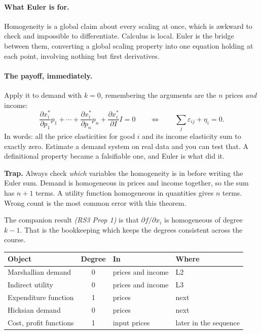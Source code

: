 \documentclass[11pt]{article}
\theoremstyle{definition}
\newenvironment{keybox}{\begin{snugshade}\noindent\ignorespaces}{\end{snugshade}}
\newcommand{\pdd}[2]{\frac{\partial #1}{\partial #2}}
\newcommand{\src}[1]{\textit{\small (#1)}}
\begin{document}
\paragraph{What Euler is for.} Homogeneity is a global claim about every scaling at once,
which is awkward to check and impossible to differentiate. Calculus is local. Euler is the
bridge between them, converting a global scaling property into one equation holding at each
point, involving nothing but first derivatives.

\paragraph{The payoff, immediately.} Apply it to demand with $k=0$, remembering the
arguments are the $n$ prices \emph{and} income:
\[
\pdd{x_i^*}{p_1}p_1+\cdots+\pdd{x_i^*}{p_n}p_n+\pdd{x_i^*}{I}I=0
\qquad\Longleftrightarrow\qquad
\sum_j \varepsilon_{ij}+\eta_i=0.
\]
In words: all the price elasticities for good $i$ and its income elasticity sum to exactly
zero. Estimate a demand system on real data and you can test that. A definitional property
became a falsifiable one, and Euler is what did it.

\begin{keybox}
\textbf{Trap.} Always check \emph{which} variables the homogeneity is in before writing the
Euler sum. Demand is homogeneous in prices and income together, so the sum has $n+1$ terms.
A utility function homogeneous in quantities gives $n$ terms. Wrong count is the most common
error with this theorem.
\end{keybox}

\vspace{3pt}
\noindent The companion result \src{RS3 Prop 1} is that $\partial f/\partial x_i$ is
homogeneous of degree $k-1$. That is the bookkeeping which keeps the degrees consistent
across the course.

\begin{center}
\begin{tabular}{@{}lcll@{}}
\toprule
\textbf{Object} & \textbf{Degree} & \textbf{In} & \textbf{Where} \\
\midrule
Marshallian demand & 0 & prices and income & L2 \\
Indirect utility & 0 & prices and income & L3 \\
Expenditure function & 1 & prices & next \\
Hicksian demand & 0 & prices & next \\
Cost, profit functions & 1 & input prices & later in the sequence \\
\bottomrule
\end{tabular}
\end{center}
\end{document}
